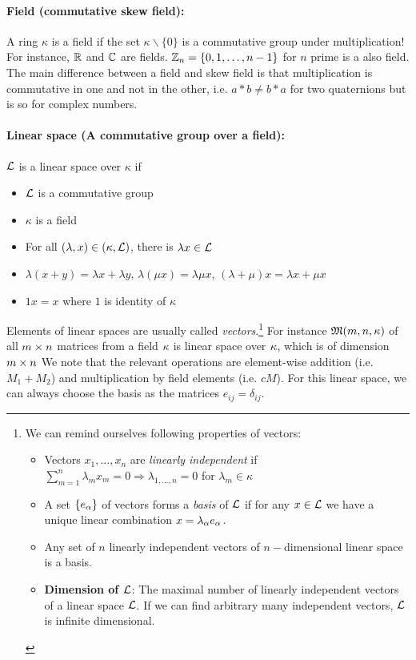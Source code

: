 \documentclass[12pt]{article}
\numberwithin{equation}{section}
\begin{document}
\paragraph{Field (commutative skew field):} A ring $\kappa$ is a field if the set $\kappa\backslash \{0\}$ is a commutative group under multiplication! For instance, $\mathbb{R}$ and $\mathbb{C}$ are fields. $\mathbb{Z}_n=\{0,1,\dots,n-1\}$ for $n$ prime is a also field. The main difference between a field and skew field is that multiplication is commutative in one and not in the other, i.e. $a*b\ne b*a$ for two quaternions but is so for complex numbers.

\paragraph{Linear space (A commutative group over a field):} $\mathcal{L}$ is a linear space over $\kappa$ if
	\begin{itemize}
		\item  $\mathcal{L}$ is a commutative group
		\item $\kappa$ is a field
		\item For all $(\lambda,x)\in (\kappa,\mathcal{L})$, there is $\lambda x\in \mathcal{L}$
		\item $\lambda(x+y)=\lambda x+\lambda y$, $\lambda (\mu x)=\lambda \mu x$, $(\lambda+\mu)x=\lambda x+\mu x$
		\item $1x=x$ where $1$ is identity of $\kappa$
	\end{itemize}
Elements of linear spaces are usually called \emph{vectors}.\footnote{
We can remind ourselves following properties of vectors:
\begin{itemize}
	\item 
	Vectors $x_1,\dots,x_n$ are \emph{linearly independent} if $\sum\limits_{m=1}^{n}\lambda_mx_m=0 \Rightarrow \lambda_{1,\dots,n}=0$ for $\lambda_m\in \kappa$
\item A set $\{e_\alpha\}$ of vectors forms a \emph{basis} of $\mathcal{L}$ if for any $x\in \mathcal{L}$ we have a unique linear combination $x=\lambda_\alpha e_\alpha$.
	\item Any set of $n$ linearly independent vectors of $n-$dimensional linear space is a basis.
	\item \textbf{Dimension of $\mathcal{L}$}: The maximal number of linearly independent vectors of a linear space $\mathcal{L}$. If we can find arbitrary many independent vectors, $\mathcal{L}$ is infinite dimensional.
\end{itemize}
} For instance $\mathfrak{M}(m,n,\kappa)$ of all $m\times n$ matrices from a field $\kappa$ is linear space over $\kappa$, which is of dimension $m\times n$ We note that the relevant operations are element-wise addition (i.e. $M_1+M_2$) and multiplication by field elements (i.e. $cM$). For this linear space, we can always choose the basis as the matrices $e_{ij}=\delta_{ij}$.
\end{document}
